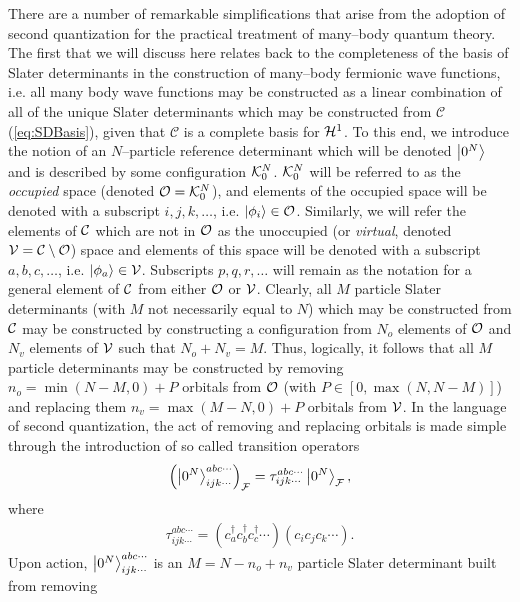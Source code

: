There are a number of remarkable simplifications that arise from the adoption of second quantization
for the practical treatment of many--body quantum theory. The first that we will discuss here
relates back to the completeness of the basis of Slater determinants in the construction
of many--body fermionic wave functions, i.e. all many body wave functions may be constructed 
as a linear combination of all of the unique Slater determinants which may be constructed
from $\mathcal{C}$ (\cref{eq:SDBasis}), given that $\mathcal{C}$ is a complete basis for $\mathcal{H}^1$. 
To this end, we introduce the notion of an $N$--particle reference
determinant which will be denoted $\left\vert 0^N \right\rangle$ and is described by some configuration $\mathcal{K}^N_0$.
$\mathcal{K}^N_0$ will be referred to as the \emph{occupied} space (denoted $\mathcal{O} = \mathcal{K}^N_0$), 
and elements of the occupied space will be denoted with a subscript $i,j,k,\dots$,  i.e.
$\left\vert \phi_i \right\rangle \in \mathcal{O}$. Similarly, we will refer the elements of $\mathcal{C}$ which are 
not in $\mathcal{O}$ as the unoccupied (or \emph{virtual}, denoted $\mathcal{V} = \mathcal{C} \setminus \mathcal{O}$) space and elements of this space
will be denoted with a subscript $a,b,c,\ldots$, i.e. $\left\vert \phi_a \right\rangle \in \mathcal{V}$. Subscripts $p,q,r,\ldots$
will remain as the notation for a general element of $\mathcal{C}$ from either $\mathcal{O}$ or $\mathcal{V}$.
Clearly, all $M$ particle Slater determinants (with $M$ not necessarily equal to $N$) which may be constructed from $\mathcal{C}$ may be constructed 
by constructing a configuration from $N_o$ elements of $\mathcal{O}$ and $N_v$ elements of $\mathcal{V}$
such that $N_o + N_v = M$. Thus, logically, it follows that all $M$ particle determinants may be
constructed by removing $ n_o = \min{(N-M,0)} + P $ orbitals from $\mathcal{O}$ (with $P\in[0,\max{(N,N-M)}]$) and replacing them $ n_v = \max{(M-N ,0)} + P$ orbitals
from $\mathcal{V}$. In the language of second quantization, the act of removing and replacing orbitals 
is made simple through the introduction of so called transition operators
\begin{align}
\left(\left\vert 0^N \right\rangle_{ijk\cdots}^{abc\cdots}\right)_{\mathcal{F}} = \tau_{ijk\cdots}^{abc\cdots} \left\vert 0^N \right\rangle_{\mathcal{F}},
\end{align}
where
\begin{align}
\tau_{ijk\cdots}^{abc\cdots} = \left(c_a^\dagger c_b^\dagger c_c^\dagger \cdots\right) \left( c_i c_j c_k \cdots\right).
\end{align}
Upon action, $\left\vert 0^N \right\rangle_{ijk\cdots}^{abc\cdots}$ is an $ M = N - n_o + n_v $ particle Slater determinant built from removing
